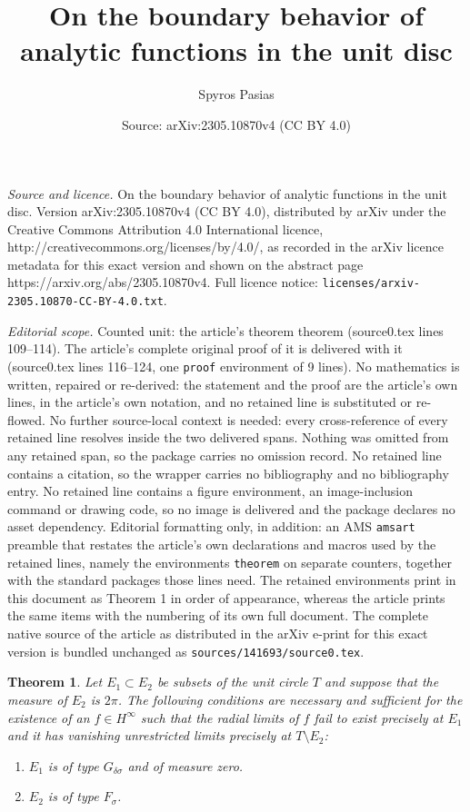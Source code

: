 \documentclass[10pt,a4paper]{amsart}
\title{On the boundary behavior of analytic functions in the unit disc}
\author{Spyros Pasias}
\date{Source: arXiv:2305.10870v4 (CC BY 4.0)}
\newtheorem{theorem}{Theorem}
\begin{document}
\maketitle

\noindent\emph{Source and licence.} On the boundary behavior of analytic functions in the unit disc. Version arXiv:2305.10870v4 (CC BY 4.0), distributed by arXiv under the Creative Commons Attribution 4.0 International licence, http://creativecommons.org/licenses/by/4.0/, as recorded in the arXiv licence metadata for this exact version and shown on the abstract page https://arxiv.org/abs/2305.10870v4. Full licence notice: \texttt{licenses/arxiv-2305.10870-CC-BY-4.0.txt}.\par\smallskip

\noindent\textit{Editorial scope.} Counted unit: the article's theorem theorem (source0.tex lines 109--114). The article's complete original proof of it is delivered with it (source0.tex lines 116--124, one \texttt{proof} environment of 9 lines). No mathematics is written, repaired or re-derived: the statement and the proof are the article's own lines, in the article's own notation, and no retained line is substituted or re-flowed.  No further source-local context is needed: every cross-reference of every retained line resolves inside the two delivered spans.  Nothing was omitted from any retained span, so the package carries no omission record.  No retained line contains a citation, so the wrapper carries no bibliography and no bibliography entry.  No retained line contains a figure environment, an image-inclusion command or drawing code, so no image is delivered and the package declares no asset dependency.  Editorial formatting only, in addition: an AMS \texttt{amsart} preamble that restates the article's own declarations and macros used by the retained lines, namely the environments \texttt{theorem} on separate counters, together with the standard packages those lines need.  The retained environments print in this document as Theorem 1 in order of appearance, whereas the article prints the same items with the numbering of its own full document.  The complete native source of the article as distributed in the arXiv e-print for this exact version is bundled unchanged as \texttt{sources/141693/source0.tex}.
\begin{theorem} Let $E_1\subset E_2$ be subsets of the unit circle $T$ and suppose that the measure of $E_2$ is $2\pi$. The following conditions are necessary and sufficient for the existence of an $f\in H^\infty$ such that the radial limits of $f$ fail to exist precisely at $E_1$ and it has vanishing unrestricted limits precisely at $T\setminus E_2$:
\begin{enumerate}
\item $E_1$ is of type $G_{\delta\sigma}$ and of measure zero.
\item $E_2$ is of type $F_\sigma$.
\end{enumerate}
\end{theorem}
\end{document}
